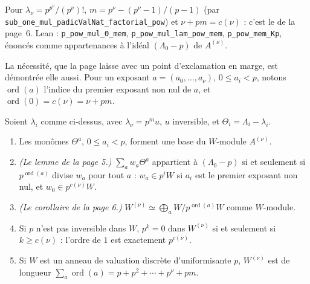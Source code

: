 \noindent Pour $\lambda_\nu = p^{p^\nu}/(p^\nu)!$, $m = p^\nu - (p^\nu - 1)/(p-1)$ (par \texttt{sub\_one\_mul\_padicValNat\_factorial\_pow}) et $\nu + pm = c(\nu)$ : c'est le  de la page~6. Lean : \texttt{p\_pow\_mul\_Θ\_mem}, \texttt{p\_pow\_mul\_lam\_pow\_mem}, \texttt{p\_pow\_mem\_Kp}, énoncés comme appartenances à l'idéal $(\Lambda_0 - p)$ de $A^{(\nu)}$.

La nécessité, que la page laisse  avec un point d'exclamation en marge, est démontrée elle aussi. Pour un exposant $a = (a_0, \ldots, a_\nu)$, $0 \leq a_i < p$, notons $\operatorname{ord}(a)$ l'indice du premier exposant non nul de $a$, et $\operatorname{ord}(0) = c(\nu) = \nu + pm$.

\begin{encadre}
\begin{theoreme}
Soient $\lambda_i$ comme ci-dessus, avec $\lambda_\nu = p^m u$, $u$ inversible, et $\Theta_i = \Lambda_i - \lambda_i$.
\begin{enumerate}
\item Les monômes $\Theta^a$, $0 \leq a_i < p$, forment une base du $W$-module $A^{(\nu)}$.
\item \emph{(Le lemme de la page 5.)} $\sum_a w_a\Theta^a$ appartient à $(\Lambda_0 - p)$ si et seulement si $p^{\operatorname{ord}(a)}$ divise $w_a$ pour tout $a$ : $w_a \in p^iW$ si $a_i$ est le premier exposant non nul, et $w_0 \in p^{c(\nu)}W$.
\item \emph{(Le corollaire de la page 6.)} $W^{(\nu)} \simeq \bigoplus_a W/p^{\operatorname{ord}(a)}W$ comme $W$-module.
\item Si $p$ n'est pas inversible dans $W$, $p^k = 0$ dans $W^{(\nu)}$ si et seulement si $k \geq c(\nu)$ : l'ordre de $1$ est exactement $p^{c(\nu)}$.
\item Si $W$ est un anneau de valuation discrète d'uniformisante $p$, $W^{(\nu)}$ est de longueur $\sum_a \operatorname{ord}(a) = p + p^2 + \cdots + p^\nu + pm$.
\end{enumerate}
\end{theoreme}
\end{encadre}

